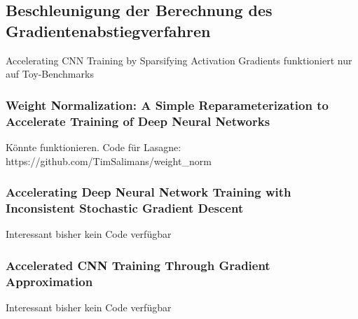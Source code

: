 \subsection{Beschleunigung der Berechnung des Gradientenabstiegverfahren}

Accelerating CNN Training by Sparsifying Activation Gradients funktioniert nur auf Toy-Benchmarks 


\subsubsection{Weight Normalization: A Simple Reparameterization
to Accelerate Training of Deep Neural Networks}


Könnte funktionieren. Code für Lasagne: https://github.com/TimSalimans/weight\_norm


\subsubsection{Accelerating Deep Neural Network Training with Inconsistent Stochastic Gradient Descent}

Interessant bisher kein Code verfügbar

\subsubsection{Accelerated CNN Training Through Gradient Approximation }

Interessant bisher kein Code verfügbar


